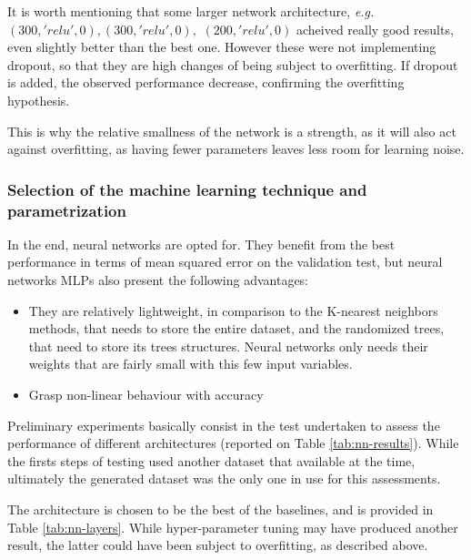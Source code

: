 It is worth mentioning that some larger network architecture, \textit{e.g.} $(300, 'relu', 0), (300, 'relu', 0),$ $(200, 'relu', 0)$ acheived really good results, even slightly better than the best one. However these were not implementing dropout, so that they are high changes of being subject to overfitting. If dropout is added, the observed performance decrease, confirming the overfitting hypothesis.

This is why the relative smallness of the network is a strength, as it will also act against overfitting, as having fewer parameters leaves less room for learning noise.

\subsubsection{Selection of the machine learning technique and parametrization}

In the end, neural networks are opted for. They benefit from the best performance in terms of mean squared error on the validation test, but neural networks MLPs also present the following advantages:
\begin{itemize}
    \item They are relatively lightweight, in comparison to the K-nearest neighbors methods, that needs to store the entire dataset, and the randomized trees, that need to store its trees structures. Neural networks only needs their weights that are fairly small with this few input variables.
    \item Grasp non-linear behaviour with accuracy
\end{itemize}

Preliminary experiments basically consist in the test undertaken to assess the performance of different architectures (reported on Table \ref{tab:nn-results}). While the firsts steps of testing used another dataset that available at the time, ultimately the generated dataset was the only one in use for this assessments.

The architecture is chosen to be the best of the baselines, and is provided in Table \ref{tab:nn-layers}. While hyper-parameter tuning may have produced another result, the latter could have been subject to overfitting, as described above. 

